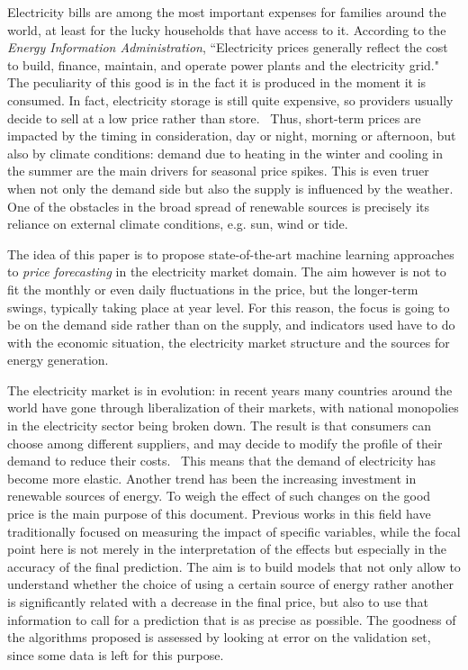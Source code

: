 \documentclass[a4paper,12pt]{book}
\begin{document}
Electricity bills are among the most important expenses for families around the world, at least for the lucky households that have access to it. According to the \textit{Energy Information Administration}, ``Electricity prices generally reflect the cost to build, finance, maintain, and operate power plants and the electricity grid."~\cite{weron2014electricity} The peculiarity of this good is in the fact it is produced in the moment it is consumed. In fact, electricity storage is still quite expensive, so providers usually decide to sell at a low price rather than store.~\cite{fuchs2012technology} Thus, short-term prices are impacted by the timing in consideration, day or night, morning or afternoon, but also by climate conditions: demand due to heating in the winter and cooling in the summer are the main drivers for seasonal price spikes. This is even truer when not only the demand side but also the supply is influenced by the weather. One of the obstacles in the broad spread of renewable sources is precisely its reliance on external climate conditions, e.g. sun, wind or tide.

The idea of this paper is to propose state-of-the-art machine learning approaches to \textit{price forecasting} in the electricity market domain. The aim however is not to fit the monthly or even daily fluctuations in the price, but the longer-term swings, typically taking place at year level. For this reason, the focus is going to be on the demand side rather than on the supply, and indicators used have to do with the economic situation, the electricity market structure and the sources for energy generation.

The electricity market is in evolution: in recent years many countries around the world have gone through liberalization of their markets, with national monopolies in the electricity sector being broken down. The result is that consumers can choose among different suppliers, and may decide to modify the profile of their demand to reduce their costs.~\cite{867149} This means that the demand of electricity has become more elastic. Another trend has been the increasing investment in renewable sources of energy. To weigh the effect of such changes on the good price is the main purpose of this document. Previous works in this field have traditionally focused on measuring the impact of specific variables, while the focal point here is not merely in the interpretation of the effects but especially in the accuracy of the final prediction. The aim is to build models that not only allow to understand whether the choice of using a certain source of energy rather another is significantly related with a decrease in the final price, but also to use that information to call for a prediction that is as precise as possible. The goodness of the algorithms proposed is assessed by looking at error on the validation set, since some data is left for this purpose.
\end{document}
